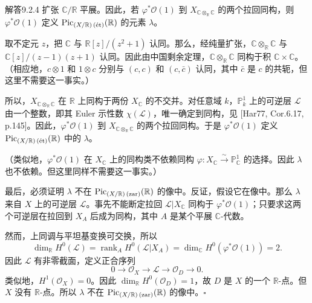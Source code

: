 \begin{origstatement}{解答}{9.2.4}\label{appA:ans924}
扩张 $\mathbb C/\mathbb R$ 平展。因此，若 $\varphi^*\mathcal O(1)$ 到 $X_{\mathbb C\otimes_{\mathbb R}\mathbb C}$ 的两个拉回同构，则 $\varphi^*\mathcal O(1)$ 定义 $\operatorname{Pic}_{(X/\mathbb R)\,(\text{ét})}(\mathbb R)$ 的元素 $\lambda$。

取不定元 $z$，把 $\mathbb C$ 与 $\mathbb R[z]/(z^2+1)$ 认同。那么，经纯量扩张，$\mathbb C\otimes_{\mathbb R}\mathbb C$ 与 $\mathbb C[z]/(z-1)(z+1)$ 认同。因此由中国剩余定理，$\mathbb C\otimes_{\mathbb R}\mathbb C$ 同构于积 $\mathbb C\times\mathbb C$。（相应地，$c\otimes1$ 和 $1\otimes c$ 分别与 $(c,c)$ 和 $(c,\bar c)$ 认同，其中 $\bar c$ 是 $c$ 的共轭，但这里不需要这一事实。）

所以，$X_{\mathbb C\otimes_{\mathbb R}\mathbb C}$ 在 $\mathbb R$ 上同构于两份 $X_{\mathbb C}$ 的不交并。对任意域 $k$，$\mathbb P_k^1$ 上的可逆层 $\mathcal L$ 由一个整数，即其 Euler 示性数 $\chi(\mathcal L)$，唯一确定到同构，见 [Har77, Cor.6.17, p.145]。因此，$\varphi^*\mathcal O(1)$ 到 $X_{\mathbb C\otimes_{\mathbb R}\mathbb C}$ 的两个拉回同构。于是 $\varphi^*\mathcal O(1)$ 定义 $\operatorname{Pic}_{(X/\mathbb R)\,(\text{ét})}(\mathbb R)$ 中的 $\lambda$。

（类似地，$\varphi^*\mathcal O(1)$ 在 $X_{\mathbb C}$ 上的同构类不依赖同构 $\varphi\colon X_{\mathbb C}\xrightarrow{\sim}\mathbb P_{\mathbb C}^1$ 的选择。因此 $\lambda$ 也不依赖。但这里同样不需要这一事实。）

最后，必须证明 $\lambda$ 不在 $\operatorname{Pic}_{(X/\mathbb R)\,(\mathrm{zar})}(\mathbb R)$ 的像中。反证，假设它在像中。那么 $\lambda$ 来自 $X$ 上的可逆层 $\mathcal L$。事先不能断定拉回 $\mathcal L|X_{\mathbb C}$ 同构于 $\varphi^*\mathcal O(1)$；只要求这两个可逆层在拉回到 $X_A$ 后成为同构，其中 $A$ 是某个平展 $\mathbb C$-代数。

然而，上同调与平坦基变换可交换，所以
\[
 \dim_{\mathbb R}H^0(\mathcal L)
 =\operatorname{rank}_A H^0(\mathcal L|X_A)
 =\dim_{\mathbb C}H^0(\varphi^*\mathcal O(1))=2.
\]
因此 $\mathcal L$ 有非零截面，定义正合序列
\[
 0\longrightarrow\mathcal O_X\longrightarrow\mathcal L\longrightarrow\mathcal O_D\longrightarrow0.
\]
类似地，$H^1(\mathcal O_X)=0$。因此 $\dim_{\mathbb R}H^0(\mathcal O_D)=1$，故 $D$ 是 $X$ 的一个 $\mathbb R$-点。但 $X$ 没有 $\mathbb R$-点。所以 $\lambda$ 不在 $\operatorname{Pic}_{(X/\mathbb R)\,(\mathrm{zar})}(\mathbb R)$ 的像中。\hfill$\square$
\end{origstatement}

